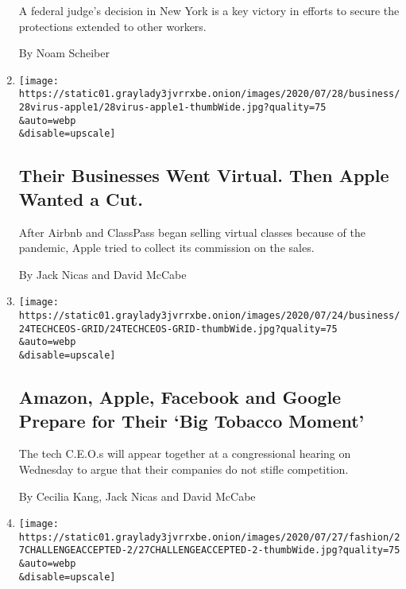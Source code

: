 \begin{enumerate}
  A federal judge's decision in New York is a key victory in efforts to
  secure the protections extended to other workers.

  By Noam Scheiber
\item
  \href{/2020/07/28/technology/apple-app-store-airbnb-classpass.html}{}

  \texttt{[image: https://static01.graylady3jvrrxbe.onion/images/2020/07/28/business/28virus-apple1/28virus-apple1-thumbWide.jpg?quality=75\\\&auto=webp\\\&disable=upscale]}

  \hypertarget{their-businesses-went-virtual-then-apple-wanted-a-cut}{%
  \subsection{Their Businesses Went Virtual. Then Apple Wanted a
  Cut.}\label{their-businesses-went-virtual-then-apple-wanted-a-cut}}

  After Airbnb and ClassPass began selling virtual classes because of
  the pandemic, Apple tried to collect its commission on the sales.

  By Jack Nicas and David McCabe
\item
  \href{/2020/07/28/technology/amazon-apple-facebook-google-antitrust-hearing.html}{}

  \texttt{[image: https://static01.graylady3jvrrxbe.onion/images/2020/07/24/business/24TECHCEOS-GRID/24TECHCEOS-GRID-thumbWide.jpg?quality=75\\\&auto=webp\\\&disable=upscale]}

  \hypertarget{amazon-apple-facebook-and-google-prepare-for-their-big-tobacco-moment}{%
  \subsection{Amazon, Apple, Facebook and Google Prepare for Their `Big
  Tobacco
  Moment'}\label{amazon-apple-facebook-and-google-prepare-for-their-big-tobacco-moment}}

  The tech C.E.O.s will appear together at a congressional hearing on
  Wednesday to argue that their companies do not stifle competition.

  By Cecilia Kang, Jack Nicas and David McCabe
\item
  \href{/2020/07/27/style/challenge-accepted-instagram.html}{}

  \texttt{[image: https://static01.graylady3jvrrxbe.onion/images/2020/07/27/fashion/27CHALLENGEACCEPTED-2/27CHALLENGEACCEPTED-2-thumbWide.jpg?quality=75\\\&auto=webp\\\&disable=upscale]}


\end{enumerate}
